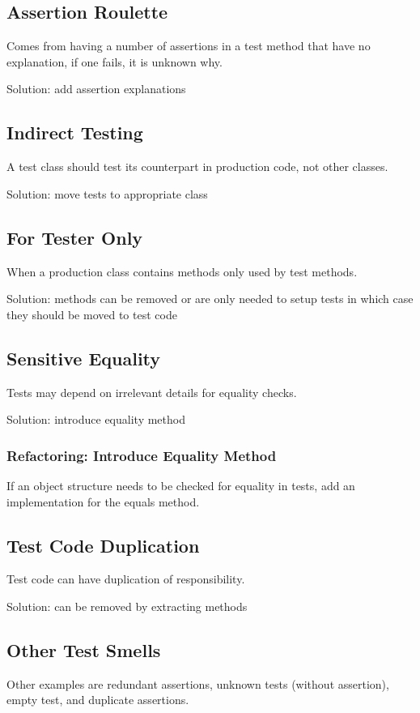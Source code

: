 \documentclass[11pt]{article}
\begin{document}
\subsection{Assertion Roulette}
\label{sec:org7543319}
Comes from having a number of assertions in a test method
that have no explanation, if one fails, it is unknown why.

Solution: add assertion explanations
\subsection{Indirect Testing}
\label{sec:org03e7f44}
A test class should test its counterpart in production code,
not other classes.

Solution: move tests to appropriate class
\subsection{For Tester Only}
\label{sec:org0335f8c}
When a production class contains methods only used by test methods.

Solution: methods can be removed or are only needed to setup tests
in which case they should be moved to test code
\subsection{Sensitive Equality}
\label{sec:org76c1d1f}
Tests may depend on irrelevant details for equality checks.

Solution: introduce equality method
\subsubsection{Refactoring: Introduce Equality Method}
\label{sec:org67e4583}
If an object structure needs to be checked for equality in
tests, add an implementation for the equals method.
\subsection{Test Code Duplication}
\label{sec:orgcabe8b9}
Test code can have duplication of responsibility.

Solution: can be removed by extracting methods
\subsection{Other Test Smells}
\label{sec:orgb0df1d0}
Other examples are redundant assertions, unknown tests (without
assertion), empty test, and duplicate assertions.
\end{document}
